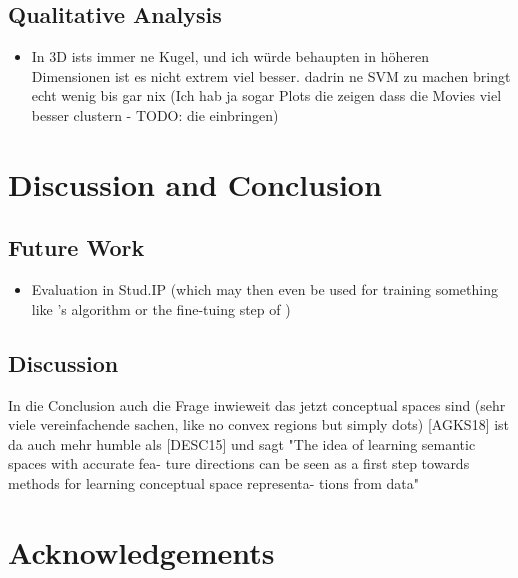 \documentclass[11pt,
  paper=a4, 
  hidelinks,
  bibliography=totocnumbered,
	captions=tableheading,
	BCOR=10mm
]{scrreprt}
\theoremstyle{definition}
\begin{document}
\section{Qualitative Analysis}

\begin{itemize}
	\item In 3D ists immer ne Kugel, und ich würde behaupten in höheren Dimensionen ist es nicht extrem viel besser. dadrin ne SVM zu machen bringt echt wenig bis gar nix (Ich hab ja sogar Plots die zeigen dass die Movies viel besser clustern - TODO: die einbringen)
\end{itemize}


\chapter{Discussion and Conclusion}

\section{Future Work}
\begin{itemize}
	\item Evaluation in Stud.IP (which may then even be used for training something like \cite{VISR12}'s algorithm or the fine-tuing step of \cite{Ager2018})
\end{itemize}

\section{Discussion}

In die Conclusion auch die Frage inwieweit das jetzt conceptual spaces sind (sehr viele vereinfachende sachen, like no convex regions but simply dots)
[AGKS18] ist da auch mehr humble als [DESC15] und sagt "The idea of learning semantic spaces with accurate fea- ture directions can be seen as a first step towards methods for learning conceptual space representa- tions from data"


\chapter*{Acknowledgements}



\glsaddall
\printglossaries %

\printbibliography
\end{document}
